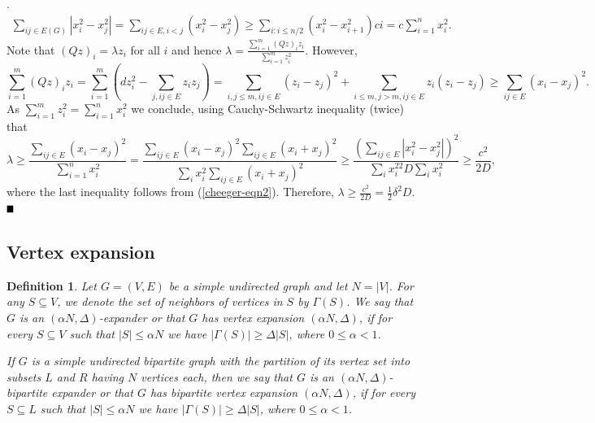 \documentclass{article}
\newtheorem{definition}[theorem]{Definition}
\newcommand{\bproof}{\noindent{\bf Proof}}
\newcommand{\eproof}{\hspace*{\fill}$\rule{2mm}{2mm}$~~~~\bigskip}
\renewenvironment{proof}{\bproof. }{\eproof}
\begin{document}
\begin{proof}
\begin{eqnarray}\label{cheeger-eqn2}
\sum_{ij\in E(G)}|x_i^2-x_j^2|=\sum_{ij\in E,i<j}(x_i^2-x_j^2)\geq \sum_{i:i\leq n/2}(x_i^2-x_{i+1}^2)ci=c\sum_{i=1}^nx_i^2.
\end{eqnarray}
Note that $(Qz)_i=\lambda z_i$ for all $i$ and hence $\lambda =\frac{\sum_{i=1}^m(Qz)_iz_i}{\sum_{i=1}^mz_i^2}$. However,
\[
\sum_{i=1}^m(Qz)_iz_i=\sum_{i=1}^m(dz_i^2-\sum_{j,ij\in E}z_iz_j)=\sum_{i,j\leq m, ij\in E}(z_i-z_j)^2+\sum_{i\leq m,j>m,ij\in E}z_i(z_i-z_j)\geq \sum_{ij\in E}(x_i-x_j)^2.
\]
As $\sum_{i=1}^mz_i^2=\sum_{i=1}^nx_i^2$ we conclude, using Cauchy-Schwartz inequality (twice) that
\[
\lambda\geq\frac{\sum_{ij\in E}(x_i-x_j)^2}{\sum_{i=1}^nx_i^2}=\frac{\sum_{ij\in E}(x_i-x_j)^2\sum_{ij\in E}(x_i+x_j)^2}{\sum_ix_i^2\sum_{ij\in E}(x_i+x_j)^2}\geq \frac{(\sum_{ij\in E}|x_i^2-x_j^2|)^2}{\sum_ix_i^22D\sum_ix_i^2}\geq \frac{c^2}{2D},
\]
where the last inequality follows from (\ref{cheeger-eqn2}). Therefore, $\lambda\geq \frac{c^2}{2D}=\frac{1}{2}\delta^2D$.
\end{proof}

\subsection{Vertex expansion}
\begin{definition}
Let $G=(V,E)$ be a simple undirected graph and let $N=|V|$. For any $S\subseteq V$, we denote the set of neighbors of vertices in $S$ by $\Gamma(S)$. We say that $G$ is an $(\alpha N,\Delta )$-expander or that $G$ has vertex expansion $(\alpha N,\Delta )$, if for every $S\subseteq V$ such that $|S|\leq\alpha N$ we have $|\Gamma(S)|\geq \Delta |S|$, where $0\leq \alpha <1$.

If $G$ is a simple undirected bipartite graph with the partition of its vertex set into subsets $L$ and $R$ having $N$ vertices each, then we say that $G$ is an $(\alpha N,\Delta )$-bipartite expander or that $G$ has bipartite vertex expansion $(\alpha N,\Delta )$, if for every $S\subseteq L$ such that $|S|\leq\alpha N$ we have $|\Gamma(S)|\geq \Delta|S|$, where $0\leq \alpha <1$.
\end{definition}
\end{document}
